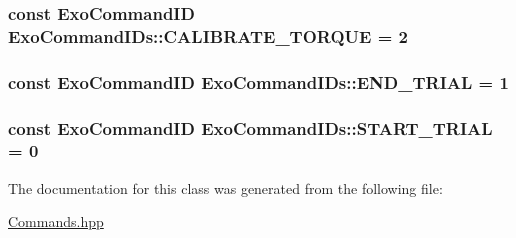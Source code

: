 \subsubsection[{\texorpdfstring{C\+A\+L\+I\+B\+R\+A\+T\+E\+\_\+\+T\+O\+R\+Q\+UE}{CALIBRATE_TORQUE}}]{\setlength{\rightskip}{0pt plus 5cm}const {\bf Exo\+Command\+ID} Exo\+Command\+I\+Ds\+::\+C\+A\+L\+I\+B\+R\+A\+T\+E\+\_\+\+T\+O\+R\+Q\+UE = 2\hspace{0.3cm}{\ttfamily [static]}}\hypertarget{classExoCommandIDs_af8e8a8a8a8e1bf4ebb8ad2ef561f8dd9}{}\label{classExoCommandIDs_af8e8a8a8a8e1bf4ebb8ad2ef561f8dd9}
\subsubsection[{\texorpdfstring{E\+N\+D\+\_\+\+T\+R\+I\+AL}{END_TRIAL}}]{\setlength{\rightskip}{0pt plus 5cm}const {\bf Exo\+Command\+ID} Exo\+Command\+I\+Ds\+::\+E\+N\+D\+\_\+\+T\+R\+I\+AL = 1\hspace{0.3cm}{\ttfamily [static]}}\hypertarget{classExoCommandIDs_a72245f17b9ebda2742d181facde3c192}{}\label{classExoCommandIDs_a72245f17b9ebda2742d181facde3c192}
\subsubsection[{\texorpdfstring{S\+T\+A\+R\+T\+\_\+\+T\+R\+I\+AL}{START_TRIAL}}]{\setlength{\rightskip}{0pt plus 5cm}const {\bf Exo\+Command\+ID} Exo\+Command\+I\+Ds\+::\+S\+T\+A\+R\+T\+\_\+\+T\+R\+I\+AL = 0\hspace{0.3cm}{\ttfamily [static]}}\hypertarget{classExoCommandIDs_afb527e21397c4ed34c37761c8e66c3a8}{}\label{classExoCommandIDs_afb527e21397c4ed34c37761c8e66c3a8}


The documentation for this class was generated from the following file\+:\begin{DoxyCompactItemize}
\item 
\hyperlink{Commands_8hpp}{Commands.\+hpp}\end{DoxyCompactItemize}
